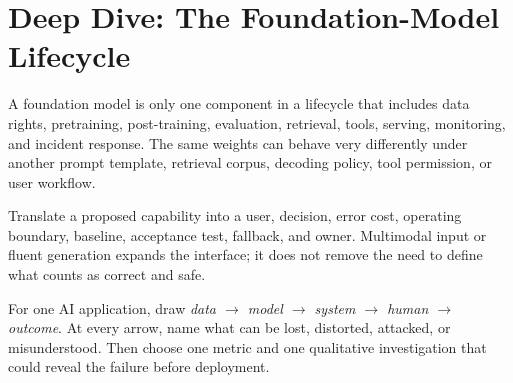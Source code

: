 
\expandafter\def\csname almanachdeepdive@orientation\endcsname{%
\section{Deep Dive: The Foundation-Model Lifecycle}
\begin{tcbitemize}[skin=sectionraster]
\tcbitem[title={One Model, Many System Layers},raster multicolumn=3]
A foundation model is only one component in a lifecycle that includes data
rights, pretraining, post-training, evaluation, retrieval, tools, serving,
monitoring, and incident response.
The same weights can behave very differently under another prompt template,
retrieval corpus, decoding policy, tool permission, or user workflow.

\tcbitem[title={Capability Is Not a Deployment Decision},raster multicolumn=3]
Translate a proposed capability into a user, decision, error cost, operating
boundary, baseline, acceptance test, fallback, and owner.
Multimodal input or fluent generation expands the interface; it does not remove
the need to define what counts as correct and safe.

\tcbitem[title={Mini Design Review},raster multicolumn=6]
For one AI application, draw
\emph{data $\rightarrow$ model $\rightarrow$ system $\rightarrow$ human
$\rightarrow$ outcome}.
At every arrow, name what can be lost, distorted, attacked, or misunderstood.
Then choose one metric and one qualitative investigation that could reveal the
failure before deployment.
\end{tcbitemize}
}


